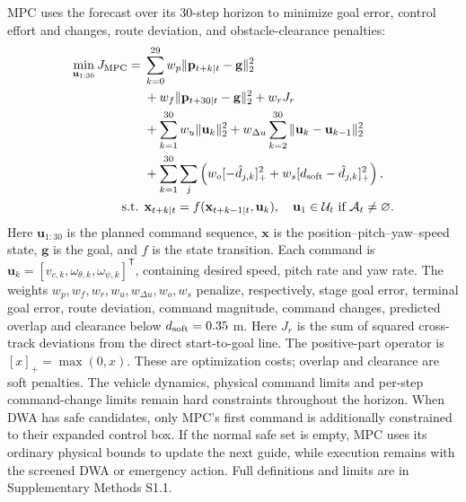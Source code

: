 \documentclass[conference,letterpaper]{IEEEtran}
\begin{document}
MPC uses the forecast over its 30-step horizon to minimize goal error, control effort and changes, route deviation, and obstacle-clearance penalties:
\begingroup\small
\begin{equation}
\begin{aligned}
\min_{\mathbf u_{1:30}}J_{\rm MPC}={}&
\sum_{k=0}^{29}w_p\|\mathbf p_{t+k|t}-\mathbf g\|_2^2\\
&+w_f\|\mathbf p_{t+30|t}-\mathbf g\|_2^2+w_rJ_r\\
&+\sum_{k=1}^{30}w_u\|\mathbf u_k\|_2^2
+w_{\Delta u}\sum_{k=2}^{30}\|\mathbf u_k-\mathbf u_{k-1}\|_2^2\\
&+\sum_{k=1}^{30}\sum_j
\left(w_o[-\hat d_{j,k}]_+^2+w_s[d_{\rm soft}-\hat d_{j,k}]_+^2\right),\\
\text{s.t. }&\mathbf x_{t+k|t}=f(\mathbf x_{t+k-1|t},\mathbf u_k),\quad
\mathbf u_1\in\mathcal U_t\ \text{if }\mathcal A_t\ne\varnothing.
\end{aligned}
\label{eq:mpc}
\end{equation}
\endgroup
Here $\mathbf u_{1:30}$ is the planned command sequence, $\mathbf x$ is the position--pitch--yaw--speed state, $\mathbf g$ is the goal, and $f$ is the state transition. Each command is $\mathbf u_k=[v_{c,k},\omega_{\theta,k},\omega_{\psi,k}]^{\mathsf T}$, containing desired speed, pitch rate and yaw rate. The weights $w_p,w_f,w_r,w_u,w_{\Delta u},w_o,w_s$ penalize, respectively, stage goal error, terminal goal error, route deviation, command magnitude, command changes, predicted overlap and clearance below $d_{\rm soft}=0.35$ m. Here $J_r$ is the sum of squared cross-track deviations from the direct start-to-goal line. The positive-part operator is $[x]_+=\max(0,x)$. These are optimization costs; overlap and clearance are soft penalties. The vehicle dynamics, physical command limits and per-step command-change limits remain hard constraints throughout the horizon. When DWA has safe candidates, only MPC's first command is additionally constrained to their expanded control box. If the normal safe set is empty, MPC uses its ordinary physical bounds to update the next guide, while execution remains with the screened DWA or emergency action. Full definitions and limits are in Supplementary Methods S1.1.
\end{document}
